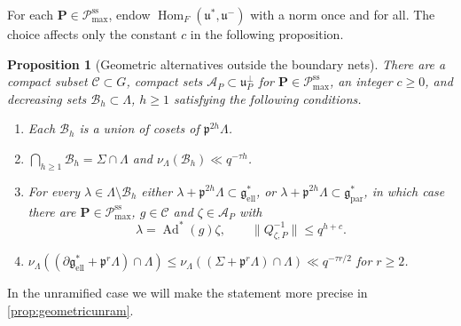 \documentclass[11pt,reqno]{amsart}
\numberwithin{equation}{section}
\theoremstyle{plain}
\newtheorem{proposition}[theorem]{Proposition}
\theoremstyle{definition}
\theoremstyle{remark}
\theoremstyle{plain}
\newcommand{\pp}{\mathfrak{p}}   %
\newcommand{\Lat}{\mathcal{L}}   %
\newcommand{\dLat}{\Lambda}      %
\newcommand{\bG}{\mathbf{G}}     %
\newcommand{\bP}{\mathbf{P}}     %
\newcommand{\g}{\mathfrak{g}}    %
\newcommand{\gd}{\mathfrak{g}^*} %
\newcommand{\uu}{\mathfrak{u}}   %
\newcommand{\Ell}[2][]{#2_{#1\mathrm{ell}}}   %
\newcommand{\Par}[2][]{#2_{#1\mathrm{par}}}
\newcommand{\Bad}{\mathcal{B}}   %
\newcommand{\bnets}{boundary nets}
\newcommand{\Pcss}{\mathscr{P}^{\mathrm{ss}}_{\mathrm{max}}}  %
\newcommand{\norm}[1]{\lVert#1\rVert}
\DeclareMathOperator{\Ad}{Ad}
\newcommand{\eexp}{\tau}
\newcommand{\lf}{\lambda}
\newcommand{\nf}{\zeta}
\newcommand{\Crv}{\Sigma}
\begin{document}
For each $\bP\in\Pcss$, endow $\operatorname{Hom}_F(\uu^*,\uu^-)$ with a norm once and for all.
The choice affects only the constant $c$ in the following proposition.

\begin{proposition}[Geometric alternatives outside the \bnets{}]\label{prop:geometric}
There are a compact subset $\mathcal C\subset G$, compact sets
$\mathcal A_P\subset\uu_P^\perp$ for $\bP\in\Pcss$, an integer $c\ge0$,
and decreasing sets $\Bad_h\subset\dLat$, $h\ge1$ satisfying the following conditions.
\begin{enumerate}[label=\textup{(\arabic*)},ref=\arabic*]
\item\label{item:geo-cosets} Each $\Bad_h$ is a union of cosets of $\pp^{2h}\dLat$.
\item\label{item:geo-measure} $\bigcap_{h\ge1}\Bad_h=\Crv\cap\dLat$ and
$\nu_{\dLat}(\Bad_h)\ll q^{-\eexp h}$.
\item\label{item:geo-alt} For every $\lf\in\dLat\setminus\Bad_h$ either $\lf+\pp^{2h}\dLat\subset\Ell{\gd}$, or
$\lf+\pp^{2h}\dLat\subset\Par{\gd}$, in which case there are
$\bP\in\Pcss$, $g\in\mathcal C$ and $\nf\in\mathcal A_P$ with
\[
\lf=\Ad^*(g)\nf,\qquad \norm{Q_{\nf,P}^{-1}}\le q^{h+c}.
\]
\item\label{item:geo-tube} $\nu_{\dLat}((\partial\Ell{\gd}+\pp^r\dLat)\cap\dLat)\le\nu_{\dLat}((\Crv+\pp^r\dLat)\cap\dLat)\ll q^{-\eexp r/2}$
for $r\ge2$.
\end{enumerate}
\end{proposition}

In the unramified case we will make the statement more precise in \cref{prop:geometricunram}.
\end{document}
